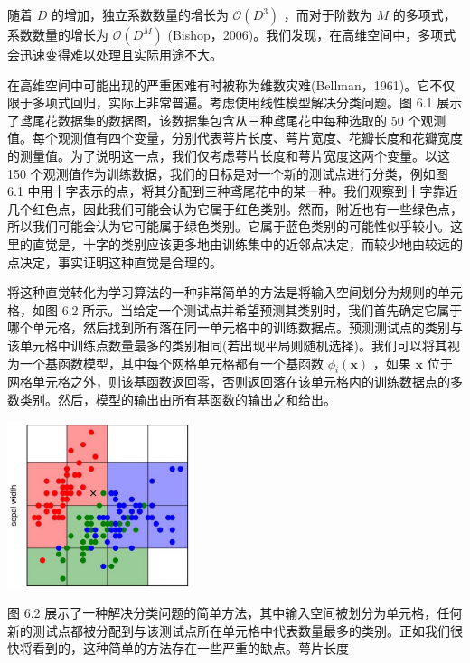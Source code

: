 \documentclass[10pt]{article}
\begin{document}
随着 \(D\) 的增加，独立系数数量的增长为 \(\mathcal{O}\left( {D}^{3}\right)\) ，而对于阶数为 \(M\) 的多项式，系数数量的增长为 \(\mathcal{O}\left( {D}^{M}\right)\) (Bishop，2006)。我们发现，在高维空间中，多项式会迅速变得难以处理且实际用途不大。

在高维空间中可能出现的严重困难有时被称为维数灾难(Bellman，1961)。它不仅限于多项式回归，实际上非常普遍。考虑使用线性模型解决分类问题。图 6.1 展示了鸢尾花数据集的数据图，该数据集包含从三种鸢尾花中每种选取的 50 个观测值。每个观测值有四个变量，分别代表萼片长度、萼片宽度、花瓣长度和花瓣宽度的测量值。为了说明这一点，我们仅考虑萼片长度和萼片宽度这两个变量。以这 150 个观测值作为训练数据，我们的目标是对一个新的测试点进行分类，例如图 6.1 中用十字表示的点，将其分配到三种鸢尾花中的某一种。我们观察到十字靠近几个红色点，因此我们可能会认为它属于红色类别。然而，附近也有一些绿色点，所以我们可能会认为它可能属于绿色类别。它属于蓝色类别的可能性似乎较小。这里的直觉是，十字的类别应该更多地由训练集中的近邻点决定，而较少地由较远的点决定，事实证明这种直觉是合理的。

将这种直觉转化为学习算法的一种非常简单的方法是将输入空间划分为规则的单元格，如图 6.2 所示。当给定一个测试点并希望预测其类别时，我们首先确定它属于哪个单元格，然后找到所有落在同一单元格中的训练数据点。预测测试点的类别与该单元格中训练点数量最多的类别相同(若出现平局则随机选择)。我们可以将其视为一个基函数模型，其中每个网格单元格都有一个基函数 \({\phi }_{i}\left( \mathbf{x}\right)\) ，如果 \(\mathbf{x}\) 位于网格单元格之外，则该基函数返回零，否则返回落在该单元格内的训练数据点的多数类别。然后，模型的输出由所有基函数的输出之和给出。

\begin{center}
\includegraphics[max width=0.4\textwidth]{images/0194e279-9b28-703a-88f4-c3ac21e2010d_193_949_346_602_550_0.jpg}
\end{center}
\hspace*{3em} 

图 6.2 展示了一种解决分类问题的简单方法，其中输入空间被划分为单元格，任何新的测试点都被分配到与该测试点所在单元格中代表数量最多的类别。正如我们很快将看到的，这种简单的方法存在一些严重的缺点。萼片长度
\end{document}
